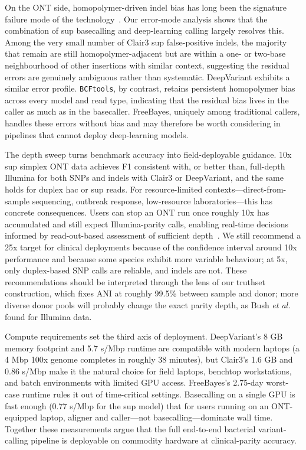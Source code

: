 \documentclass[11pt]{article}
\begin{document}
On the ONT side, homopolymer-driven indel bias has long been the signature failure mode of the technology~\citep{sereika2022oxford}. Our error-mode analysis shows that the combination of sup basecalling and deep-learning calling largely resolves this. Among the very small number of Clair3 sup false-positive indels, the majority that remain are still homopolymer-adjacent but are within a one- or two-base neighbourhood of other insertions with similar context, suggesting the residual errors are genuinely ambiguous rather than systematic. DeepVariant exhibits a similar error profile. \texttt{BCFtools}, by contrast, retains persistent homopolymer bias across every model and read type, indicating that the residual bias lives in the caller as much as in the basecaller. FreeBayes, uniquely among traditional callers, handles these errors without bias and may therefore be worth considering in pipelines that cannot deploy deep-learning models.

The depth sweep turns benchmark accuracy into field-deployable guidance. 10x sup simplex ONT data achieves F1 consistent with, or better than, full-depth Illumina for both SNPs and indels with Clair3 or DeepVariant, and the same holds for duplex hac or sup reads. For resource-limited contexts---direct-from-sample sequencing, outbreak response, low-resource laboratories---this has concrete consequences. Users can stop an ONT run once roughly 10x has accumulated and still expect Illumina-parity calls, enabling real-time decisions informed by read-out-based assessment of sufficient depth~\citep{quick2016realtime}. We still recommend a 25x target for clinical deployments because of the confidence interval around 10x performance and because some species exhibit more variable behaviour; at 5x, only duplex-based SNP calls are reliable, and indels are not. These recommendations should be interpreted through the lens of our truthset construction, which fixes ANI at roughly 99.5\% between sample and donor; more diverse donor pools will probably change the exact parity depth, as Bush \emph{et al.}~\citep{bush2020genomic} found for Illumina data.

Compute requirements set the third axis of deployment. DeepVariant's 8 GB memory footprint and 5.7 s/Mbp runtime are compatible with modern laptops (a 4 Mbp 100x genome completes in roughly 38 minutes), but Clair3's 1.6 GB and 0.86 s/Mbp make it the natural choice for field laptops, benchtop workstations, and batch environments with limited GPU access. FreeBayes's 2.75-day worst-case runtime rules it out of time-critical settings. Basecalling on a single GPU is fast enough (0.77 s/Mbp for the sup model) that for users running on an ONT-equipped laptop, aligner and caller---not basecalling---dominate wall time. Together these measurements argue that the full end-to-end bacterial variant-calling pipeline is deployable on commodity hardware at clinical-parity accuracy.
\end{document}
